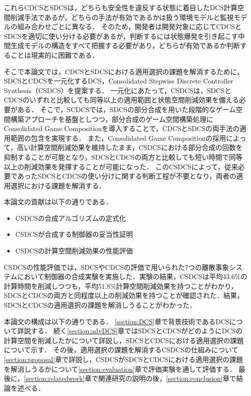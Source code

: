 これらCDCSとSDCSは，どちらも安全性を違反する状態に着目したDCS計算空間削減手法であるが，どちらの手法が有効であるかは扱う環境モデルと監視モデルの組み合わせごとに異なる．
そのため，開発者は開発対象に応じてCDCSとSDCSを適切に使い分ける必要があるが，判断するには状態爆発を引き起こす中間生成モデルの構造をすべて把握する必要があり，どちらが有効であるか判断することは現実的に困難である．

そこで本論文では，CDCSとSDCSにおける適用選択の課題を解消するために，SDCSとCDCSを一元化するDCS，Consolidated Stepwise Discrete Controller Synthesis（CSDCS）を提案する．
一元化にあたって，CSDCSは，SDCSとCDCSのいずれと比較しても同等以上の適用範囲と状態空間削減効果を備える必要がある．
そこで，SCDCSでは，SDCSの部分合成を用いた段階的なゲーム空間構築アプローチを基盤としつつ，部分合成のゲーム空間構築処理にConsolidated Game Compositionを導入することで，CDCSとSDCSの両手法の適用範囲の包含を実現する．
また，Consolidated Game Compositionの採用によって，高い計算空間削減効果を維持したまま，CSDCSにおける部分合成の回数を抑制することが可能となり，SDCSとCDCSの両方と比較しても短い時間で同等以上の削減効果を発揮することが可能になった．
このCSDCSによって，従来必要であったSDCSとCDCSの使い分けに関する判断工程が不要となり，両者の適用選択における課題を解消する．

本論文の貢献は以下の通りである．
\begin{itemize}
	\item CSDCSの合成アルゴリズムの定式化
	\item CSDCSが合成する制御器の妥当性証明
	\item CSDCSの計算空間削減効果の性能評価
\end{itemize}
CSDCSの性能評価では，SDCSやCDCSの評価で用いられた7つの離散事象システムにおいて制御器の合成実験を実施した．実験の結果，CSDCSは平均43.6\%の計算時間を削減しつつも，平均51.8\%計算空間削減効果を持つことがわかり，SDCSとCDCSの両方と同程度以上の削減効果を持つことが確認された．結果，SDCSとCDCSの適用選択の課題を解消しうることがわかった．

本論文の構成は以下の通りである．
\ref{section:DCS}章で背景技術であるDCSについて詳説する．
続く\ref{section:advDCS}章ではSDCSとCDCSがどのようにDCSの計算空間を削減したかについて詳説し，SDCSとCDCSにおける適用選択の課題について示す．
その後，適用選択の課題を解消するCSDCSの仕組みについて\ref{section:proposal}章で詳説し，CSDCSがSDCSとCDCSにおける適用選択の課題を解消しうるかについて\ref{section:evaluation}章で評価実験を通して評価する．
最後に，\ref{section:relatedwork}章で関連研究の説明の後，\ref{section:conclusion}章で結論を述べる．